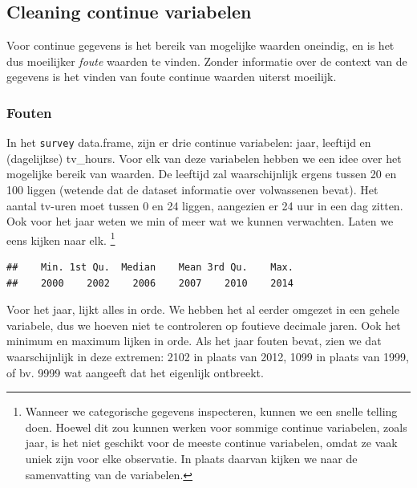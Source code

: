 \documentclass[]{tufte-book}
\newenvironment{Shaded}{}{}
\newcommand{\KeywordTok}[1]{\textcolor[rgb]{0.00,0.44,0.13}{\textbf{#1}}}
\newcommand{\NormalTok}[1]{#1}
\newcommand{\OperatorTok}[1]{\textcolor[rgb]{0.40,0.40,0.40}{#1}}
\begin{document}
\hypertarget{cleaning-continue-variabelen}{%
\subsection{Cleaning continue variabelen}\label{cleaning-continue-variabelen}}

Voor continue gegevens is het bereik van mogelijke waarden oneindig, en is het dus moeilijker \emph{foute} waarden te vinden. Zonder informatie over de context van de gegevens is het vinden van foute continue waarden uiterst moeilijk.

\hypertarget{fouten}{%
\subsubsection{Fouten}\label{fouten}}

In het \texttt{survey} data.frame, zijn er drie continue variabelen: jaar, leeftijd en (dagelijkse) tv\_hours. Voor elk van deze variabelen hebben we een idee over het mogelijke bereik van waarden. De leeftijd zal waarschijnlijk ergens tussen 20 en 100 liggen (wetende dat de dataset informatie over volwassenen bevat). Het aantal tv-uren moet tussen 0 en 24 liggen, aangezien er 24 uur in een dag zitten. Ook voor het jaar weten we min of meer wat we kunnen verwachten. Laten we eens kijken naar elk. \footnote{Wanneer we categorische gegevens inspecteren, kunnen we een snelle telling doen. Hoewel dit zou kunnen werken voor sommige continue variabelen, zoals jaar, is het niet geschikt voor de meeste continue variabelen, omdat ze vaak uniek zijn voor elke observatie. In plaats daarvan kijken we naar de samenvatting van de variabelen.}

\begin{Shaded}
\end{Shaded}

\begin{verbatim}
##    Min. 1st Qu.  Median    Mean 3rd Qu.    Max. 
##    2000    2002    2006    2007    2010    2014
\end{verbatim}

Voor het jaar, lijkt alles in orde. We hebben het al eerder omgezet in een gehele variabele, dus we hoeven niet te controleren op foutieve decimale jaren. Ook het minimum en maximum lijken in orde. Als het jaar fouten bevat, zien we dat waarschijnlijk in deze extremen: 2102 in plaats van 2012, 1099 in plaats van 1999, of bv. 9999 wat aangeeft dat het eigenlijk ontbreekt.
\end{document}
